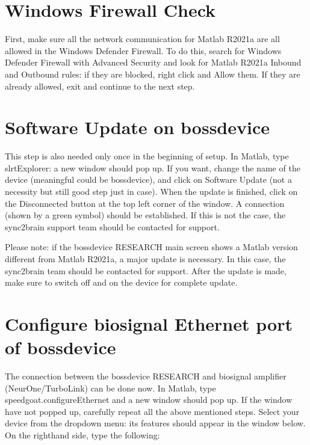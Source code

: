 \documentclass[letterpaper,10pt,english]{sphinxmanual}
\begin{document}
\section{Windows Firewall Check}
\label{\detokenize{2_setup_bossdevice_research:windows-firewall-check}}
\sphinxAtStartPar
First, make sure all the network communication for Matlab R2021a are all allowed in the Windows Defender Firewall. To do this, search for Windows Defender Firewall with Advanced Security and look for Matlab R2021a Inbound and Outbound rules: if they are blocked, right click and Allow them. If they are already allowed, exit and continue to the next step.


\section{Software Update on bossdevice}
\label{\detokenize{2_setup_bossdevice_research:software-update-on-bossdevice}}
\sphinxAtStartPar
This step is also needed only once in the beginning of setup. In Matlab, type slrtExplorer: a new window should pop up. If you want, change the name of the device (meaningful could be bossdevice), and click on Software Update (not a necessity but still good step just in case). When the update is finished, click on the Disconnected button at the top left corner of the window. A connection (shown by a green symbol) should be established. If this is not the case, the sync2brain support team should be contacted for support.

\sphinxAtStartPar
Please note: if the bossdevice RESEARCH main screen shows a Matlab version different from Matlab R2021a, a major update is necessary. In this case, the sync2brain team should be contacted for support. After the update is made, make sure to switch off and on the device for complete update.


\section{Configure biosignal Ethernet port of bossdevice}
\label{\detokenize{2_setup_bossdevice_research:configure-biosignal-ethernet-port-of-bossdevice}}
\sphinxAtStartPar
The connection between the bossdevice RESEARCH and biosignal amplifier (NeurOne/TurboLink) can be done now. In Matlab, type speedgoat.configureEthernet and a new window should pop up. If the window have not popped up, carefully repeat all the above mentioned steps. Select your device from the dropdown menu: its features should appear in the window below. On the right\sphinxhyphen{}hand side, type the following:
\end{document}
